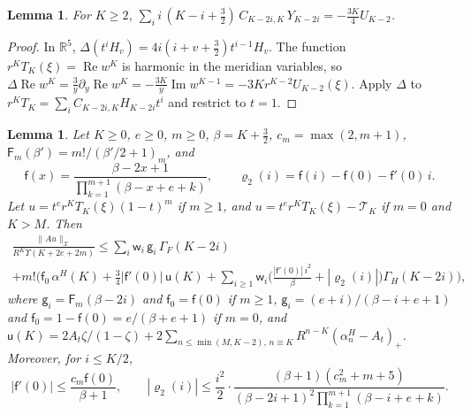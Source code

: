 \documentclass[11pt]{amsart}
\newtheorem{lemma}[theorem]{Lemma}
\theoremstyle{definition}
\theoremstyle{remark}
\numberwithin{equation}{section}
\newcommand{\R}{\mathbb{R}}
\DeclareMathOperator{\re}{Re}
\DeclareMathOperator{\im}{Im}
\newcommand{\nrm}[1]{\lVert #1\rVert}
\begin{document}
\begin{lemma}\label{r5:lem-lap}
For $K\geq2$, $\sum_ii\,(K-i+\frac32)\,C_{K-2i,K}\,Y_{K-2i}=-\frac{3K}4U_{K-2}$.
\end{lemma}

\begin{proof}
In $\R^5$, $\Delta(t^iH_v)=4i(i+v+\frac32)t^{i-1}H_v$. The function $r^KT_K(\xi)=\re w^K$ is harmonic in the meridian variables, so $\Delta\re w^K=\frac3y\partial_y\re w^K=-\frac{3K}y\im w^{K-1}=-3Kr^{K-2}U_{K-2}(\xi)$. Apply $\Delta$ to $r^KT_K=\sum_iC_{K-2i,K}H_{K-2i}t^i$ and restrict to $t=1$.
\end{proof}

\begin{lemma}\label{r5:lem-raw}
Let $K\geq0$, $e\geq0$, $m\geq0$, $\beta=K+\frac32$, $c_m=\max(2,m+1)$, $\mathsf F_m(\beta')=m!/(\beta'/2+1)_m$, and
\[
\mathsf f(x)=\frac{\beta-2x+1}{\prod_{k=1}^{m+1}(\beta-x+e+k)},\qquad\varrho_2(i)=\mathsf f(i)-\mathsf f(0)-\mathsf f'(0)\,i .
\]
Let $u=t^er^KT_K(\xi)(1-t)^m$ if $m\geq1$, and $u=t^er^KT_K(\xi)-\mathcal T_K$ if $m=0$ and $K>M$. Then
\begin{multline*}
\frac{\nrm{Au}_{\mathcal X}}{R^K\Upsilon(K+2e+2m)}\leq\sum_i\mathsf w_i\,\mathsf g_i\,\Gamma_F(K-2i)\\
+m!\Big(\mathsf f_0\,\alpha^H(K)+\frac34|\mathsf f'(0)|\,\mathsf u(K)+\sum_{i\geq1}\mathsf w_i\Big(\frac{|\mathsf f'(0)|\,i^2}\beta+|\varrho_2(i)|\Big)\Gamma_H(K-2i)\Big),
\end{multline*}
where $\mathsf g_i=\mathsf F_m(\beta-2i)$ and $\mathsf f_0=\mathsf f(0)$ if $m\geq1$, $\mathsf g_i=(e+i)/(\beta-i+e+1)$ and $\mathsf f_0=1-\mathsf f(0)=e/(\beta+e+1)$ if $m=0$, and $\mathsf u(K)=2A_t\zeta/(1-\zeta)+2\sum_{n\leq\min(M,K-2),\,n\equiv K}R^{n-K}(\alpha^H_n-A_t)_+$. Moreover, for $i\leq K/2$,
\[
|\mathsf f'(0)|\leq\frac{c_m\mathsf f(0)}{\beta+1},\qquad|\varrho_2(i)|\leq\frac{i^2}2\cdot\frac{(\beta+1)(c_m^2+m+5)}{(\beta-2i+1)^2\prod_{k=1}^{m+1}(\beta-i+e+k)} .
\]
\end{lemma}
\end{document}
